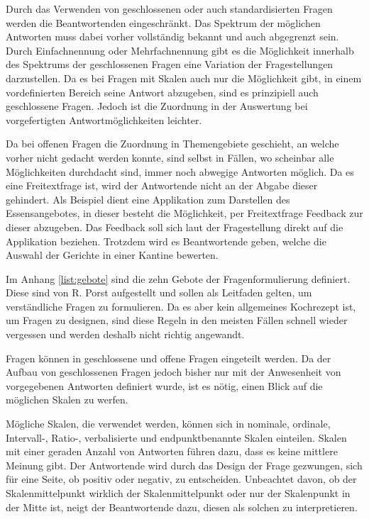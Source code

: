 Durch das Verwenden von geschlossenen oder auch standardisierten Fragen werden die Beantwortenden eingeschränkt.
Das Spektrum der möglichen Antworten muss dabei vorher vollständig bekannt und auch abgegrenzt sein\autocite[S.66]{2014Fragebogen}. %
Durch Einfachnennung oder Mehrfachnennung gibt es die Möglichkeit innerhalb des Spektrums der geschlossenen Fragen eine Variation der Fragestellungen darzustellen\autocite[S.31]{2009Fragebogen}. %
Da es bei Fragen mit Skalen auch nur die Möglichkeit gibt, in einem vordefinierten Bereich seine Antwort abzugeben, sind es prinzipiell auch geschlossene Fragen.
Jedoch ist die Zuordnung in der Auswertung bei vorgefertigten Antwortmöglichkeiten leichter.

Da bei offenen Fragen die Zuordnung in Themengebiete geschieht, an welche vorher nicht gedacht werden konnte, sind selbst in Fällen, wo scheinbar alle Möglichkeiten durchdacht sind, immer noch abwegige Antworten möglich.
Da es eine Freitextfrage ist, wird der Antwortende nicht an der Abgabe dieser gehindert. 
Als Beispiel dient eine Applikation zum Darstellen des Essensangebotes, in dieser besteht die Möglichkeit, per Freitextfrage Feedback zur dieser abzugeben.
Das Feedback soll sich laut der Fragestellung direkt auf die Applikation beziehen.
Trotzdem wird es Beantwortende geben, welche die Auswahl der Gerichte in einer Kantine bewerten.


Im Anhang \vref{list:gebote} sind die zehn Gebote der Fragenformulierung definiert\autocite{RolfPorst}. %
Diese sind von R. Porst aufgestellt und sollen als Leitfaden gelten, um verständliche Fragen zu formulieren.
Da es aber kein allgemeines Kochrezept ist, um Fragen zu designen, sind diese Regeln in den meisten Fällen schnell wieder vergessen und werden deshalb nicht richtig angewandt.%

Fragen können in geschlossene und offene Fragen eingeteilt werden.
Da der Aufbau von geschlossenen Fragen jedoch bisher nur mit der Anwesenheit von vorgegebenen Antworten definiert wurde, ist es nötig, einen Blick auf die möglichen Skalen zu werfen.

Mögliche Skalen, die verwendet werden, können sich in nominale, ordinale,\\
 Intervall-, Ratio-, verbalisierte und endpunktbenannte Skalen einteilen\autocite[S.71]{2014Fragebogen}. %
Skalen mit einer geraden Anzahl von Antworten führen dazu, dass es keine mittlere Meinung gibt. 
Der Antwortende wird durch das Design der Frage gezwungen, sich für eine Seite, ob positiv oder negativ, zu entscheiden.
Unbeachtet davon, ob der Skalenmittelpunkt wirklich der Skalenmittelpunkt oder nur der Skalenpunkt in der Mitte ist, neigt der Beantwortende dazu, diesen als solchen zu interpretieren\autocite[S.83]{2014Fragebogen}.%


